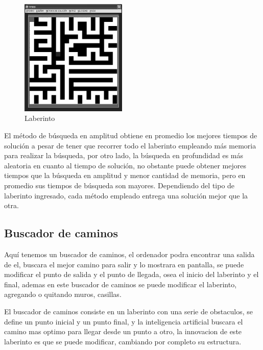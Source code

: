 \documentclass{article}%
\begin{document}
\begin{figure}[h]
\centering
\includegraphics[width=0.45\textwidth]{dev.png}
     \caption{Laberinto}
\end{figure}

El m\'etodo de b\'usqueda en amplitud obtiene en promedio los mejores tiempos de soluci\'on a pesar de tener que recorrer todo el laberinto empleando m\'as memoria para realizar la b\'usqueda, por otro lado, la b\'usqueda en profundidad es m\'as aleatoria en cuanto al tiempo de soluci\'on, no obstante puede obtener mejores tiempos que la b\'usqueda en amplitud y menor cantidad de memoria, pero en promedio sus tiempos de b\'usqueda son mayores. Dependiendo del tipo de laberinto ingresado, cada m\'etodo empleado entrega una soluci\'on mejor que la otra.

\subsection {Buscador de caminos}
Aqu\'i tenemos un buscador de caminos, el ordenador podra encontrar una salida de el, buscara el mejor camino para salir y lo mostrara en pantalla, se puede modificar el punto de salida y el punto de llegada, osea el inicio del laberinto y el final, ademas en este buscador de caminos se puede modificar el laberinto, agregando o quitando muros, casillas.

El buscador de caminos consiste en un laberinto con una serie de obstaculos, se define un punto inicial y un punto final, y la inteligencia artificial buscara el camino mas optimo para llegar desde un punto a otro, la innovacion de este laberinto es que se puede modificar, cambiando por completo su estructura.
\end{document}
